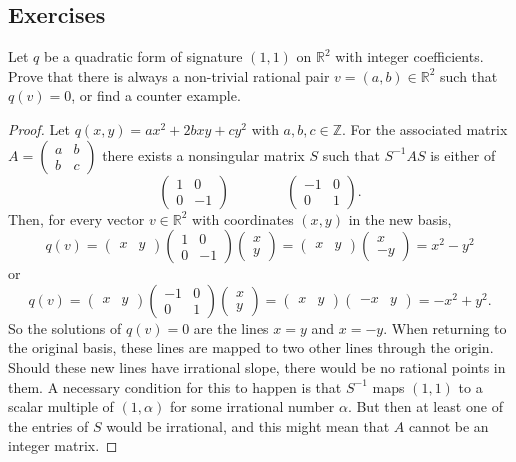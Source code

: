 \documentclass{article}
\numberwithin{equation}{section}
\newcommand{\R}{\mathbb{R}}
\newcommand{\Z}{\mathbb{Z}}
\begin{document}
	\subsection*{Exercises}
	\begin{exercise}
		Let $q$ be a quadratic form of signature $(1,1)$ on $\R^2$ with integer coefficients. Prove that there is always a non-trivial rational pair $v=(a,b)\in\R^2$ such that $q(v)=0$, or find a counter example.
	\end{exercise}
	\begin{proof}
		Let $q(x,y)=ax^2+2bxy+cy^2$ with $a,b,c\in\Z$. For the associated matrix $A=\begin{pmatrix}a&b\\b&c\end{pmatrix}$ there exists a nonsingular matrix $S$ such that $S^{-1}AS$ is either of
		\[\begin{pmatrix}
			1&0\\
			0&-1
		\end{pmatrix}\qquad\qquad\begin{pmatrix}
			-1&0\\
			0&1
		\end{pmatrix}.\]
		Then, for every vector $v\in\R^2$ with coordinates $(x,y)$ in the new basis,
		\[q(v)=\begin{pmatrix}
			x&y
		\end{pmatrix}\begin{pmatrix}
			1&0\\
			0&-1
		\end{pmatrix}\begin{pmatrix}
			x\\y
		\end{pmatrix}=
		\begin{pmatrix}
			x&y
		\end{pmatrix}
		\begin{pmatrix}
			x\\-y
		\end{pmatrix}=x^2-y^2\]
		or
		\[q(v)=\begin{pmatrix}
			x&y
		\end{pmatrix}\begin{pmatrix}
			-1&0\\
			0&1
		\end{pmatrix}\begin{pmatrix}
			x\\y
		\end{pmatrix}=
		\begin{pmatrix}
			x&y
		\end{pmatrix}
		\begin{pmatrix}
			-x&y
		\end{pmatrix}=-x^2+y^2.\]
		So the solutions of $q(v)=0$ are the lines $x=y$ and $x=-y$. When returning to the original basis, these lines are mapped to two other lines through the origin. Should these new lines have irrational slope, there would be no rational points in them. A necessary condition for this to happen is that $S^{-1}$ maps $(1,1)$ to a scalar multiple of $(1,\alpha)$ for some irrational number $\alpha$. But then at least one of the entries of $S$ would be irrational, and this {\color{magenta}might mean} that $A$ cannot be an integer matrix.
	\end{proof}
\end{document}
